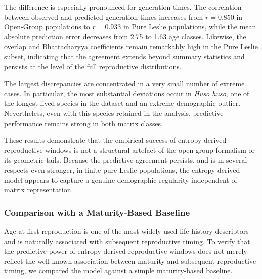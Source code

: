 \documentclass[10pt,a4paper]{amsart}
\theoremstyle{definition}
\theoremstyle{remark}
\numberwithin{equation}{section}
\begin{document}
The difference is especially pronounced for generation times. The correlation between observed and predicted generation times increases from $r=0.850$ in Open-Group populations to $r=0.933$ in Pure Leslie populations, while the mean absolute prediction error decreases from 2.75 to 1.63 age classes. Likewise, the overlap and Bhattacharyya coefficients remain remarkably high in the Pure Leslie subset, indicating that the agreement extends beyond summary statistics and persists at the level of the full reproductive distributions.

The largest discrepancies are concentrated in a very small number of extreme cases. In particular, the most substantial deviations occur in \textit{Huso huso}, one of the longest-lived species in the dataset and an extreme demographic outlier. Nevertheless, even with this species retained in the analysis, predictive performance remains strong in both matrix classes.


These results demonstrate that the empirical success of entropy-derived reproductive windows is not a structural artefact of the open-group formalism or its geometric tails. Because the predictive agreement persists,  and is in several respects even  stronger,  in finite pure Leslie populations, the entropy-derived model appears to capture a genuine demographic regularity independent of matrix representation.





\subsubsection{Comparison with a Maturity-Based Baseline}
\label{subsec_baseline}



Age at first reproduction is one of the most widely used life-history
descriptors and is naturally associated with subsequent reproductive
timing. To verify that the predictive power of entropy-derived reproductive windows does not merely reflect the well-known association between maturity and subsequent reproductive timing, we compared the model against a simple maturity-based baseline.
\end{document}
